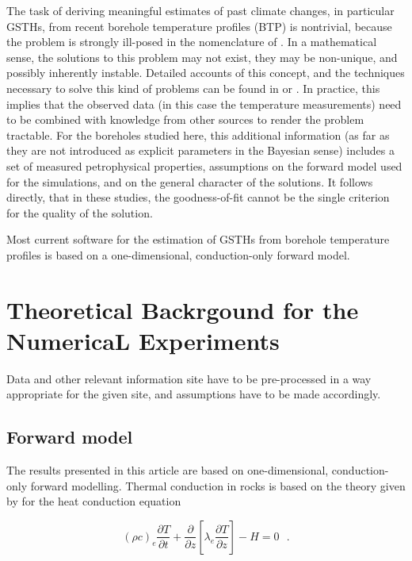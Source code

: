 \documentclass[cp]{copernicus}
\begin{document}
The task of deriving meaningful estimates of past climate changes, in particular GSTHs, from recent 
borehole temperature profiles (BTP) is nontrivial, because the problem is strongly ill-posed in the 
nomenclature of \citet{Hadamard1923a}. In a mathematical sense, the solutions to this problem may 
not exist, they may be non-unique, and possibly inherently instable. Detailed accounts of this 
concept, and the techniques necessary to solve this kind of problems can be found in 
\citep{Hansen1998a,Hansen2010a} or \citep{Aster2013a}. In practice, this implies that the observed 
data (in this case the temperature measurements) need to be combined with knowledge from other 
sources to render the problem tractable. For the boreholes studied here, this additional information 
(as far as they are not introduced as explicit parameters in the Bayesian sense) includes a set of 
measured petrophysical properties, assumptions on the forward model used for the simulations, and on 
the general character of the solutions. It follows directly, that in these studies, the 
goodness-of-fit cannot be the single criterion for the quality of the solution. 

Most current software for the estimation of GSTHs from borehole temperature profiles is based on a 
one-dimensional, conduction-only forward model.

\section{Theoretical Backrgound for the NumericaL Experiments}
\label{sec:setup}

Data and other relevant information site have to be pre-processed in a way appropriate for the given site, and assumptions have 
to be made accordingly. 


\subsection{Forward model}
\label{sec:fwd}
The results presented in this article are based on one-dimensional, conduction-only forward 
modelling. Thermal conduction in rocks is based on the theory given by \citet{Carslaw1959a} for 
the heat conduction equation 

\begin{equation}\label{eqn:1}
 {\left( {\rho c} \right)_e}\frac{{\partial T}}{{\partial t}} + \frac{\partial 
}{{\partial z}}\left[ {{\lambda _e}\frac{{\partial T}}{{\partial z}}} \right] - 
H = 0{\text{ }.}
\end{equation} 
\end{document}

